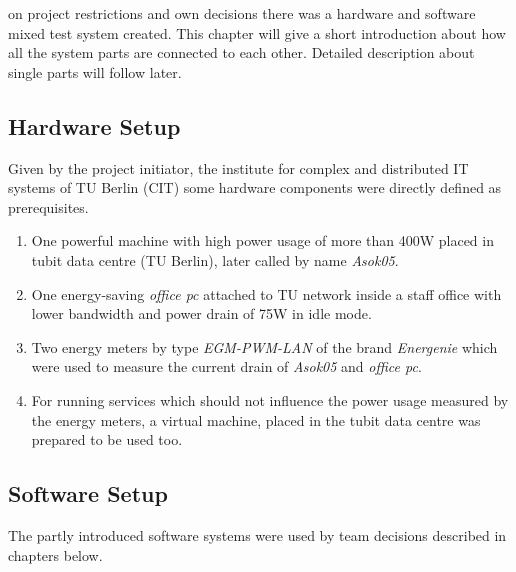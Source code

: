 
 on project restrictions and own decisions there was a hardware and software mixed test system created. This chapter will give a short introduction about how all the system parts are connected to each other. Detailed description about single parts will follow later.

\subsection{Hardware Setup}

Given by the project initiator, the institute for complex and distributed IT systems of TU Berlin (CIT) some hardware components were directly defined as prerequisites.

\begin{enumerate}

\item One powerful machine with high power usage of more than 400W placed in tubit data centre (TU Berlin), later called by name \textit{Asok05}.

\item One energy-saving \textit{office pc} attached to TU network inside a staff office with lower bandwidth and power drain of 75W in idle mode.

\item Two energy meters by type \textit{EGM-PWM-LAN} of the brand \textit{Energenie} which were used to measure the current drain of \textit{Asok05} and \textit{office pc}.

\item For running services which should not influence the power usage measured by the energy meters, a virtual machine, placed in the tubit data centre was prepared to be used too.

\end{enumerate}


\subsection{Software Setup}

The partly introduced software systems were used by team decisions described in chapters below.

